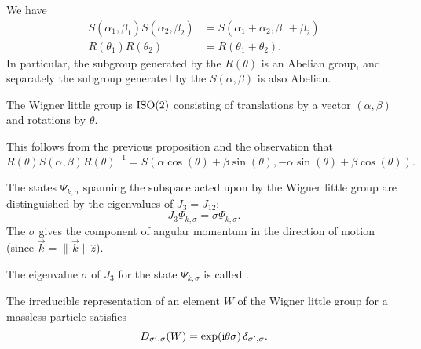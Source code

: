 \begin{proposition}
We have
\begin{subequations}
\begin{align}
S(\alpha_{1},\beta_{1})S(\alpha_{2},\beta_{2}) &= S(\alpha_{1}+\alpha_{2},\beta_{1}+\beta_{2})\\
R(\theta_{1})R(\theta_{2}) &= R(\theta_{1}+\theta_{2}).
\end{align}
\end{subequations}
In particular, the subgroup generated by the $R(\theta)$ is an Abelian
group, and separately the subgroup generated by the $S(\alpha,\beta)$ is
also Abelian.
\end{proposition}

\begin{theorem}
The Wigner little group is $\mathrm{ISO}(2)$ consisting of translations by a
vector $(\alpha,\beta)$ and rotations by $\theta$.
\end{theorem}

This follows from the previous proposition and the observation that
\begin{equation}
R(\theta)S(\alpha,\beta)R(\theta)^{-1} = S(\alpha\cos(\theta)+\beta\sin(\theta),
-\alpha\sin(\theta)+\beta\cos(\theta)).
\end{equation}

\begin{theorem}
The states $\Psi_{k,\sigma}$ spanning the subspace acted upon by the
Wigner little group are distinguished by the eigenvalues of $J_{3}=J_{12}$:
\begin{equation}
J_{3}\Psi_{k,\sigma} = \sigma\Psi_{k,\sigma}.
\end{equation}
The $\sigma$ gives the component of angular momentum in the direction of
motion (since $\vec{k}=\|\vec{k}\|\widehat{z}$).
\end{theorem}

\begin{definition}
The eigenvalue $\sigma$ of $J_{3}$ for the state $\Psi_{k,\sigma}$ is
called .
\end{definition}

\begin{theorem}
The irreducible representation of an element $W$ of the Wigner little
group for a massless particle satisfies
\begin{equation}
D_{\sigma',\sigma}(W) = \exp(\mathrm{i}\theta\sigma)\,\delta_{\sigma',\sigma}.
\end{equation}
\end{theorem}

